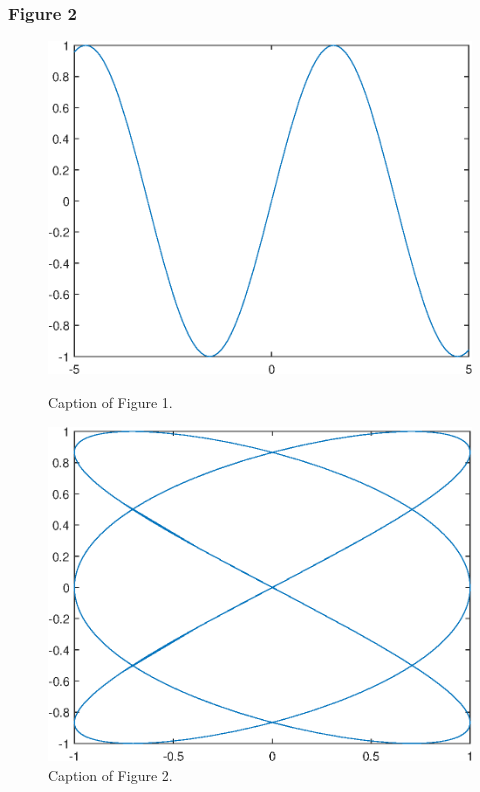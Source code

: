 \documentclass[11pt]{beamer}
\numberwithin{thm}{section}
\numberwithin{defn}{section}
\numberwithin{lmm}{section}
\theoremstyle{example}
\numberwithin{figure}{section}
\numberwithin{table}{section}
\numberwithin{equation}{section}
\begin{document}
\begin{frame}
\frametitle{Figure 2}
\begin{figure}[htb]
\centering
\begin{minipage}{0.48\linewidth}
\centering
\includegraphics[width=\linewidth]{image1}
\caption{Caption of Figure 1.}
\end{minipage}\hfill
\begin{minipage}{0.48\linewidth}
\centering
\includegraphics[width=\linewidth]{image2}
\caption{Caption of Figure 2.}
\end{minipage}
\end{figure}
\end{frame}
\end{document}
